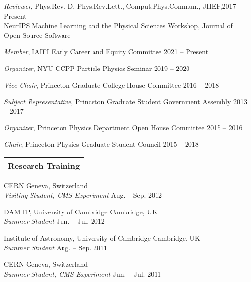 \documentclass[11pt]{article}
\newenvironment{packed_itemize}{
\begin{itemize}[label=\raisebox{0.25ex}{\tiny$\bullet$}]
  \setlength{\itemsep}{3pt}
  \setlength{\parskip}{0pt}
  \setlength{\parsep}{0pt}}{\end{itemize}
}
\begin{document}
\begin{packed_itemize}
  \item \emph{Reviewer}, Phys.Rev. {D}, Phys.Rev.Lett., Comput.Phys.Commun., JHEP,\hfill 2017 -- Present \\ NeurIPS Machine Learning and the Physical Sciences Workshop, Journal of \\ Open Source Software
  \item \emph{Member}, IAIFI Early Career and Equity Committee  \hfill 2021 -- Present
  \item \emph{Organizer}, NYU CCPP Particle Physics Seminar \hfill 2019 -- 2020
  \item \emph{Vice Chair}, Princeton Graduate College House Committee \hfill 2016 -- 2018
  \item \emph{Subject Representative}, Princeton Graduate Student Government Assembly \hfill 2013 -- 2017
  \item \emph{Organizer}, Princeton Physics Department Open House Committee  \hfill 2015 -- 2016
  \item \emph{Chair}, Princeton Physics Graduate Student Council \hfill 2015 -- 2018
\end{packed_itemize}
\vspace{2.0mm}
\newpage



\noindent
\begin{tabular*}{\textwidth}{l@{\extracolsep{\fill}}}
\large {\sc \Large{Research Training}}\\
\hline
\end{tabular*}\vspace{1.mm}

\begin{packed_itemize}
  \item CERN \hfill Geneva, Switzerland \\ \emph{Visiting Student, CMS Experiment} \hfill Aug. -- Sep. 2012
  \item DAMTP, University of Cambridge \hfill Cambridge, UK \\ \emph{Summer Student} \hfill Jun. -- Jul. 2012
  \item Institute of Astronomy, University of Cambridge \hfill Cambridge, UK \\ \emph{Summer Student} \hfill Aug. -- Sep. 2011
  \item CERN \hfill Geneva, Switzerland \\ \emph{Summer Student, CMS Experiment} \hfill Jun. -- Jul. 2011
\end{packed_itemize}
\vspace{2.0mm}
\end{document}

